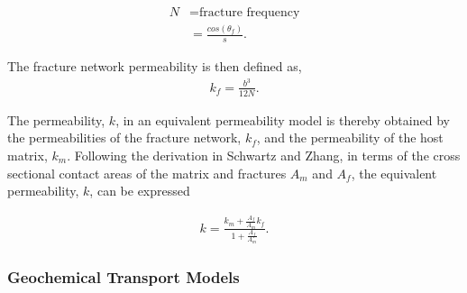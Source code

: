 \begin{align}
  N &= \mbox{fracture frequency}\nonumber\\
  &= \frac{cos(\theta_f)}{s}.
  \label{fracfreq}
\end{align}

The fracture network permeability is then defined as,
\begin{align}
  k_f = \frac{b^3}{12N}.
  \label{fracperm}
\end{align}

The permeability, $k$, in an equivalent permeability model is thereby 
obtained
by the permeabilities of the fracture network, $k_f$, and the 
permeability
of the host matrix, $k_m$. Following the derivation in Schwartz and 
Zhang, in terms of the cross sectional contact areas of the matrix and 
fractures $A_m$ and $A_f$, the equivalent permeability, $k$, can be 
expressed

\begin{align}
  k = \frac{k_m + \frac{A_f}{A_m}k_f}{1+\frac{A_f}{A_m}}.
  \label{equivperm}
\end{align}

\subsubsection{Geochemical Transport Models}






